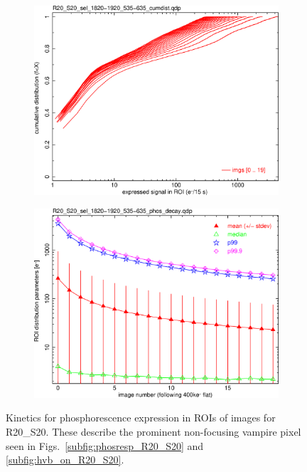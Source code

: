 \begin{figure}[!htbp]
\begin{subfigure}{0.45\textwidth}    
  \centering
  \includegraphics[width=\textwidth]{figures/phosphorescence-survey/phos_kinetics/R20_S20_sel_1820-1920_535-635_cumdist.png}    
\end{subfigure}
\hfil
\begin{subfigure}{0.45\textwidth}
  \centering
  \includegraphics[width=\textwidth]{figures/phosphorescence-survey/phos_kinetics/R20_S20_sel_1820-1920_535-635_phos_decay.png}
\end{subfigure}
\newline
\caption{Kinetics for phosphorescence expression in ROIs of images for R20\_S20. These describe the prominent non-focusing vampire pixel seen in Figs.~\ref{subfig:phosresp_R20_S20} and \ref{subfig:hvb_on_R20_S20}.}
\label{fig:phos:kinetics:R20S20}
\end{figure}

